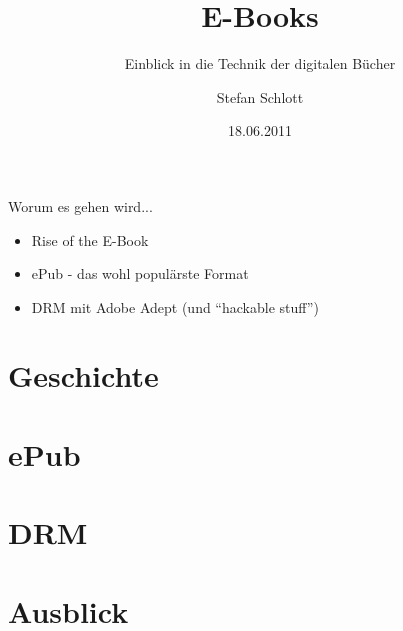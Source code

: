 \documentclass[hyperref={pdfpagelabels=false}]{beamer}
\title{E-Books}
\subtitle{Einblick in die Technik der digitalen Bücher}
\author{%
		Stefan Schlott%
}
\institute{%
	Web: \url{http://stefan.ploing.de/} \\
	Twitter: \href{https://twitter.com/\_skyr}{@\_skyr}
}
\date{18.06.2011}
\begin{document}
\begin{frame}[plain]
\titlepage
\end{frame}


\begin{frame}{Worum es gehen wird...}
	\begin{itemize}
		\item Rise of the E-Book
		\item ePub - das wohl populärste Format
		\item DRM mit Adobe Adept (und "`hackable stuff"')
	\end{itemize}
\end{frame}


\section{Geschichte}



\section{ePub}








\section{DRM}





\section{Ausblick}
\end{document}
